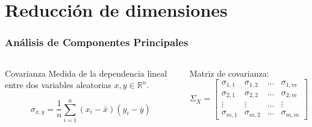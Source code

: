 \section{Reducción de dimensiones}\label{sec:dimensionalityReduction}

\begin{frame}
    \frametitle{Análisis de Componentes Principales}

    \begin{columns}
        \pause

        \begin{block}{Covarianza}
            Medida de la dependencia lineal entre dos variables aleatorias $x,y\in \mathbb{R}^n$.

            \begin{equation*}
                \sigma_{x,y} = \frac{1}{n}\sum_{i=1}^{n}{(x_i - \bar{x})(y_i - \bar{y})}
            \end{equation*}
        \end{block}

        \pause

        Matriz de covarianza:
        \begin{equation*}
            \Sigma_X = \begin{bmatrix}
                           \sigma_{1,1} & \sigma_{1,2} & \ldots & \sigma_{1,m} \\
                           \sigma_{2,1} & \sigma_{2,2} & \ldots & \sigma_{2,m} \\
                           \vdots & \vdots & \ldots & \vdots \\
                           \sigma_{m,1} & \sigma_{m,2} & \ldots & \sigma_{m,m}
            \end{bmatrix}
        \end{equation*}

    \end{columns}
\end{frame}

